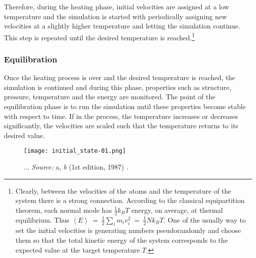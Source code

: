 Therefore, during the heating phase, initial velocities are assigned at a low temperature and the simulation is started with periodically assigning new velocities at a slightly higher temperature and letting the simulation continue. This step is repeated until the desired temperature is reached.\footnote{Clearly, between the velocities of the atoms and the temperature of the system there is a strong connection. According to the classical equipartition theorem, each normal mode has $\frac{1}{2} k_B T$ energy, on average, at thermal equilibrium. Thus $\left< E \right> \:=\: \frac{1}{2}\sum_i m_i v_i^2 \:=\: \frac{1}{2} N k_B T$.
One of the usually way to set the initial velocities is generating numbers pseudorandomly and choose them so that the total kinetic energy of the system corresponds to the expected value at the target temperature $T$.} 


\subsubsection{Equilibration}


Once the heating process is over and the desired temperature is reached, the simulation is continued and during this phase, properties such as structure, pressure, temperature and the energy are monitored. The point of the equilibration phase is to run the simulation until these properties become stable with respect to time. If in the process, the temperature increases or decreases significantly, the velocities are scaled such that the temperature returns to its desired value.

\begin{figure}[H]
\centering
\begin{minipage}[t]{0.8\textwidth}
	\centering
    \texttt{[image: initial\_state-01.png]}
    
    \footnotesize{\caption{...
    \textit{Source:} a, \textit{b} (1st edition, 1987) 
    \cite{ref:AllenTildesley_1ed}.}
    \label{fig:symplettic-integrator}
    }
\end{minipage} 
\end{figure}

